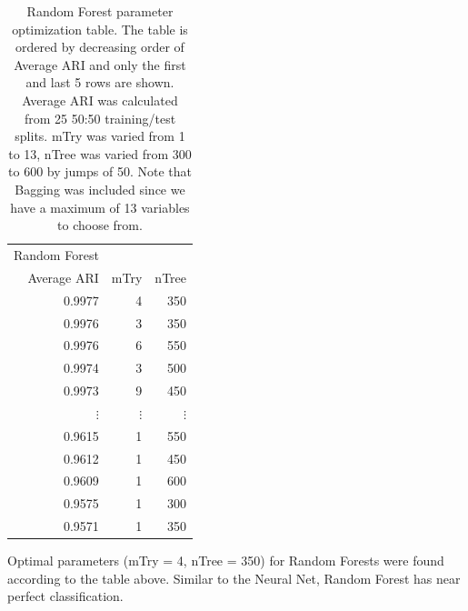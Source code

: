 \documentclass[float=false, crop=false]{standalone}
\begin{document}
\begin{table}\label{tab: paramRf}
\begin{tabular}{rrr}
  \hline
  Random Forest&& \\ 
  Average ARI & mTry & nTree \\ 
  \hline
0.9977 & 4 & 350 \\ 
  0.9976 & 3 & 350 \\ 
  0.9976 & 6 & 550 \\ 
  0.9974 & 3 & 500 \\ 
  0.9973 & 9 & 450 \\ 
    $\vdots $ & $\vdots $ & $\vdots $  \\ 
  0.9615 & 1 & 550 \\ 
  0.9612 & 1 & 450 \\ 
  0.9609 & 1 & 600 \\ 
  0.9575 & 1 & 300 \\ 
  0.9571 & 1 & 350 \\ 
   \hline
\end{tabular}
\caption{Random Forest parameter optimization table. The table is ordered by decreasing order of Average ARI and only the first and last 5 rows are shown. Average ARI was calculated from 25 50:50 training/test splits. mTry was varied from 1 to 13, nTree was varied from 300 to 600 by jumps of 50. Note that Bagging was included since we have a maximum of 13 variables to choose from.}
\end{table}


Optimal parameters (mTry = 4, nTree = 350) for Random Forests were found according to the table above. Similar to the Neural Net, Random Forest has near perfect classification. 
\end{document}
